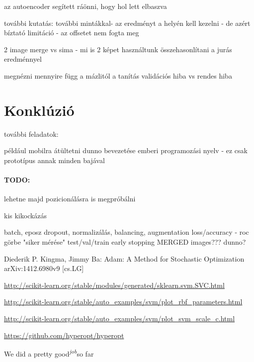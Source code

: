 az autoencoder segített ráönni, hogy hol lett elbaszva

további kutatás: további mintákkal-
az eredményt a helyén kell kezelni - de azért bíztató
limitáció - az offsetet nem fogta meg

2 image merge vs sima - mi is 2 képet használtunk
összehasonlítani a jurás eredménnyel

megnézni mennyire függ a mázlitól a tanítás
validációs hiba vs rendes hiba


\newpage
\section{Konklúzió}

további feladatok:

például mobilra átültetni
dunno bevezetése
emberi programozási nyelv - ez csak prototípus annak minden bajával

\paragraph{TODO:}

lehetne majd pozicionálásra is megpróbálni


kis kikockázás

batch, eposz
dropout, normalizálás, balancing, augmentation
loss/accuracy - roc görbe "siker mérése"
test/val/train
early stopping
MERGED images??? dunno?



\newpage
\begin{thebibliography}{9}
	Diederik P. Kingma, Jimmy Ba:
	Adam: A Method for Stochastic Optimization
	arXiv:1412.6980v9 [cs.LG]

	\url{http://scikit-learn.org/stable/modules/generated/sklearn.svm.SVC.html}
	
	\url{http://scikit-learn.org/stable/auto_examples/svm/plot_rbf_parameters.html}
	
	\url{http://scikit-learn.org/stable/auto_examples/svm/plot_svm_scale_c.html}
	
	\url{https://github.com/hyperopt/hyperopt}
	


	
\end{thebibliography}




We did a pretty good\textsuperscript{\textit{job}}so far



